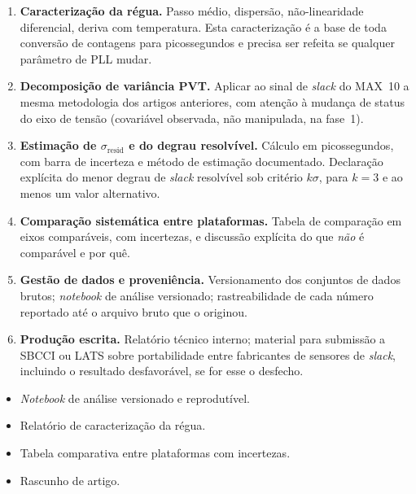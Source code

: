 \documentclass[11pt,a4paper]{article}
\newcommand{\campo}[1]{\vspace{6pt}\noindent{\bfseries\color{lescgray}#1}\par\vspace{2pt}}
\begin{document}
\campo{Tarefas}
\begin{enumerate}
  \item \textbf{Caracterização da régua.}
        Passo médio, dispersão, não-linearidade diferencial, deriva com temperatura.
        Esta caracterização é a base de toda conversão de contagens para picossegundos
        e precisa ser refeita se qualquer parâmetro de PLL mudar.

  \item \textbf{Decomposição de variância PVT.}
        Aplicar ao sinal de \emph{slack} do MAX~10 a mesma metodologia dos artigos
        anteriores, com atenção à mudança de status do eixo de tensão (covariável
        observada, não manipulada, na fase~1).

  \item \textbf{Estimação de $\sigma_\text{resid}$ e do degrau resolvível.}
        Cálculo em picossegundos, com barra de incerteza e método de estimação
        documentado. Declaração explícita do menor degrau de \emph{slack} resolvível
        sob critério $k\sigma$, para $k = 3$ e ao menos um valor alternativo.

  \item \textbf{Comparação sistemática entre plataformas.}
        Tabela de comparação em eixos comparáveis, com incertezas, e discussão
        explícita do que \emph{não} é comparável e por quê.

  \item \textbf{Gestão de dados e proveniência.}
        Versionamento dos conjuntos de dados brutos; \emph{notebook} de análise
        versionado; rastreabilidade de cada número reportado até o arquivo bruto
        que o originou.

  \item \textbf{Produção escrita.}
        Relatório técnico interno; material para submissão a SBCCI ou LATS sobre
        portabilidade entre fabricantes de sensores de \emph{slack}, incluindo
        o resultado desfavorável, se for esse o desfecho.
\end{enumerate}

\campo{Entregáveis}
\begin{itemize}
  \item \emph{Notebook} de análise versionado e reprodutível.
  \item Relatório de caracterização da régua.
  \item Tabela comparativa entre plataformas com incertezas.
  \item Rascunho de artigo.
\end{itemize}
\end{document}
